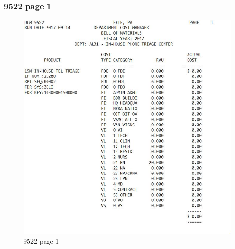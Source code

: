 \documentclass{beamer}\usepackage[]{graphicx}\usepackage[]{color}
\begin{document}
\begin{frame}[fragile]
  \frametitle{9522 page 1}
  
\begin{figure}
\includegraphics[scale=0.4]{9522_page1}
\caption{9522 page 1}
\end{figure}
  
\end{frame}
\end{document}
